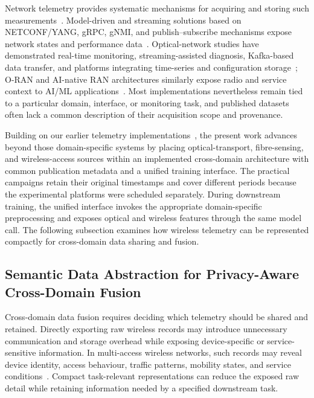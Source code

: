 \documentclass[9pt,twocolumn,twoside]{osajnl}
\begin{document}
Network telemetry provides systematic mechanisms for acquiring and storing such measurements~\cite{rfc9232}. Model-driven and streaming solutions based on NETCONF/YANG, gRPC, gNMI, and publish--subscribe mechanisms expose network states and performance data~\cite{rfc9232,gnmi2018}. Optical-network studies have demonstrated real-time monitoring, streaming-assisted diagnosis, Kafka-based data transfer, and platforms integrating time-series and configuration storage~\cite{paolucci2018telemetry,tanaka2021diagnosis,sgambelluri2022kafka,shen2025telemetry}; O-RAN and AI-native RAN architectures similarly expose radio and service context to AI/ML applications~\cite{mahmoud2026oranintelligence}. Most implementations nevertheless remain tied to a particular domain, interface, or monitoring task, and published datasets often lack a common description of their acquisition scope and provenance.

Building on our earlier telemetry implementations~\cite{shen2025telemetry,Shen2026OFCdata}, the present work advances beyond those domain-specific systems by placing optical-transport, fibre-sensing, and wireless-access sources within an implemented cross-domain architecture with common publication metadata and a unified training interface. The practical campaigns retain their original timestamps and cover different periods because the experimental platforms were scheduled separately. During downstream training, the unified interface invokes the appropriate domain-specific preprocessing and exposes optical and wireless features through the same model call. The following subsection examines how wireless telemetry can be represented compactly for cross-domain data sharing and fusion.

\subsection{Semantic Data Abstraction for Privacy-Aware Cross-Domain Fusion}

Cross-domain data fusion requires deciding which telemetry should be shared and retained. Directly exporting raw wireless records may introduce unnecessary communication and storage overhead while exposing device-specific or service-sensitive information. In multi-access wireless networks, such records may reveal device identity, access behaviour, traffic patterns, mobility states, and service conditions~\cite{8792139}. Compact task-relevant representations can reduce the exposed raw detail while retaining information needed by a specified downstream task.
\end{document}
